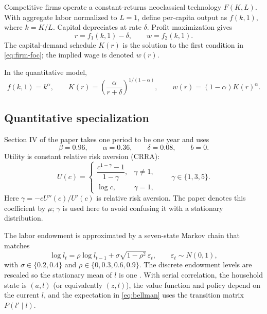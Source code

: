\documentclass[11pt]{article}
\theoremstyle{propertystyle}
\newcommand{\1}{\mathbf{1}}
\begin{document}
Competitive firms operate a constant-returns neoclassical technology
$F(K,L)$.  With aggregate labor normalized to $L=1$, define per-capita output
as $f(k,1)$, where $k=K/L$.  Capital depreciates at rate $\delta$.  Profit
maximization gives
\begin{equation}
  r=f_1(k,1)-\delta,
  \qquad w=f_2(k,1).
  \label{eq:firm-foc}
\end{equation}
The capital-demand schedule $K(r)$ is the solution to the first condition in
\cref{eq:firm-foc}; the implied wage is denoted $w(r)$.

In the quantitative model,
\begin{equation}
  f(k,1)=k^{\alpha},
  \qquad
  K(r)=\left(\frac{\alpha}{r+\delta}\right)^{1/(1-\alpha)},
  \qquad
  w(r)=(1-\alpha)K(r)^{\alpha}.
  \label{eq:cobb-douglas}
\end{equation}

\subsection{Quantitative specialization}
\label{subsec:quant}

Section IV of the paper takes one period to be one year and uses
\begin{equation}
  \beta=0.96,
  \qquad \alpha=0.36,
  \qquad \delta=0.08,
  \qquad b=0.
  \label{eq:calibration}
\end{equation}
Utility is constant relative risk aversion (CRRA):
\begin{equation}
  U(c)=
  \begin{cases}
    \dfrac{c^{1-\gamma}-1}{1-\gamma},&\gamma\neq1,\\[0.7em]
    \log c,&\gamma=1,
  \end{cases}
  \qquad \gamma\in\{1,3,5\}.
  \label{eq:crra}
\end{equation}
Here $\gamma=-cU''(c)/U'(c)$ is relative risk aversion.  The paper denotes this
coefficient by $\mu$; $\gamma$ is used here to avoid confusing it with a
stationary distribution.

The labor endowment is approximated by a seven-state Markov chain that matches
\begin{equation}
  \log l_t=\rho\log l_{t-1}
  +\sigma\sqrt{1-\rho^2}\,\varepsilon_t,
  \qquad \varepsilon_t\sim N(0,1),
  \label{eq:labor-ar1}
\end{equation}
with $\sigma\in\{0.2,0.4\}$ and
$\rho\in\{0,0.3,0.6,0.9\}$.  The discrete endowment levels are rescaled so the
stationary mean of $l$ is one \cite[pp.~675--676]{aiyagari1994}.  With serial
correlation, the household state is $(a,l)$ (or equivalently $(z,l)$), the
value function and policy depend on the current $l$, and the expectation in
\cref{eq:bellman} uses the transition matrix $P(l'\mid l)$.
\end{document}
